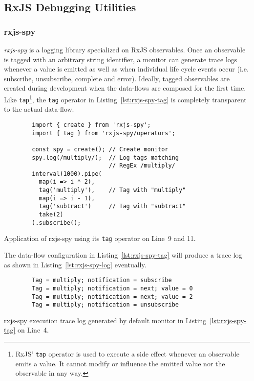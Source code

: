 \documentclass[sigplan,screen,review]{acmart}
\begin{document}
\subsection{RxJS Debugging Utilities}
\label{sec:rxjs-debugging-utilities}

\subsubsection{rxjs-spy}

\emph{rxjs-spy}\cite{rxjsspy} is a logging library specialized on RxJS observables. Once an observable is tagged with an arbitrary string identifier, a monitor can generate trace logs whenever a value is emitted as well as when individual life cycle events occur (i.e. subscribe, unsubscribe, complete and error). Ideally, tagged observables are created during development when the data-flows are composed for the first time. Like \texttt{tap}\footnote{RxJS' \texttt{tap} operator is used to execute a side effect whenever an observable emits a value. It cannot modify or influence the emitted value nor the observable in any way.}, the \texttt{tag} operator in Listing~\ref{lst:rxjs-spy-tag} is completely transparent to the actual data-flow.

\begin{listing}
	\begin{verbatim}
		import { create } from 'rxjs-spy';
		import { tag } from 'rxjs-spy/operators';

		const spy = create(); // Create monitor
		spy.log(/multiply/);  // Log tags matching
		                      // RegEx /multiply/
		interval(1000).pipe(
		  map(i => i * 2),
		  tag('multiply'),    // Tag with "multiply"
		  map(i => i - 1),
		  tag('subtract')     // Tag with "subtract"
		  take(2)
		).subscribe();
	\end{verbatim}
	\caption{Application of rxjs-spy using its \texttt{tag} operator on Line~9 and 11.}
	\label{lst:rxjs-spy-tag}
\end{listing}

The data-flow configuration in Listing~\ref{lst:rxjs-spy-tag} will produce a trace log as shown in Listing~\ref{lst:rxjs-spy-log} eventually.

\begin{listing}
	\begin{verbatim}
		Tag = multiply; notification = subscribe
		Tag = multiply; notification = next; value = 0
		Tag = multiply; notification = next; value = 2
		Tag = multiply; notification = unsubscribe
	\end{verbatim}
	\caption{rxjs-spy execution trace log generated by default monitor in Listing~\ref{lst:rxjs-spy-tag} on Line~4.}
	\label{lst:rxjs-spy-log}
\end{listing}
\end{document}

